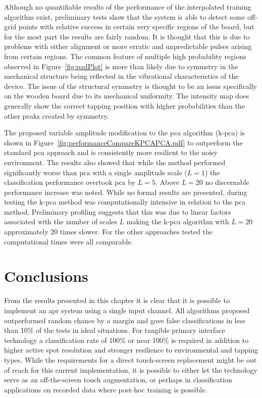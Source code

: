 Although no quantifiable results of the performance of the interpolated training algorithm exist, preliminary tests show that the system is able to detect some off- grid points with relative success in certain very specific regions of the board, but for the most part the results are fairly random. It is thought that this is due to problems with either alignment or more erratic and unpredictable pulses arising from certain regions. The common feature of multiple high probability regions observed in Figure~\ref{fig:padPlot} is more than likely due to symmetry in the mechanical structure being reflected in the vibrational characteristics of the device. The issue of the structural symmetry is thought to be an issue specifically on the wooden board due to its mechanical uniformity. The intensity map does generally show the correct tapping position with higher probabilities than the other peaks created by symmetry.

The proposed variable amplitude modification to the \gls{pca} algorithm (\gls{k-pca}) is shown in Figure~\ref{fig:performanceCompareKPCAPCA.pdf} to outperform the standard \gls{pca} approach and is consistently more resilient to the noisy environment. The results also showed that while the method performed significantly worse than \gls{pca} with a single amplitude scale ($L=1$) the classification performance overtook \gls{pca} by $L=5$. Above $L=20$ no discernable performance increase was noted. While no formal results are presented, during testing the \gls{k-pca} method was computationally intensive in relation to the \gls{pca} method. Preliminary profiling suggests that this was due to linear factors associated with the number of scales $L$ making the \gls{k-pca} algorithm with $L=20$ approximately 20 times slower. For the other approaches tested the computational times were all comparable.

\section{Conclusions}
From the results presented in this chapter it is clear that it is possible to implement an \gls{apr} system using a single input channel. All algorithms proposed outperformed random chance by a margin and gave false classifications in less than 10\% of the tests in ideal situations. For tangible primary interface technology a classification rate of 100\% or near 100\% is required in addition to higher active spot resolution and stronger resilience to environmental and tapping types. While the requirements for a direct touch-screen replacement might be out of reach for this current implementation, it is possible to either let the technology serve as an off-the-screen touch augmentation, or perhaps in classification applications on recorded data where post-hoc training is possible.

